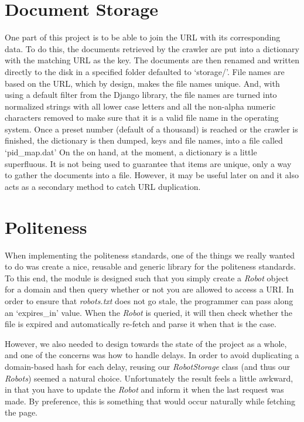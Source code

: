 \documentclass[letterpaper,11pt,twoside]{article}
\begin{document}
\section{Document Storage}
One part of this project is to be able to join the URL with its corresponding data. To do this, the documents retrieved by the crawler are put into a dictionary with the matching URL as the key. The documents are then renamed and written directly to the disk in a specified folder defaulted to ‘storage/’. File names are based on the URL, which by design, makes the file names unique. And, with using a default filter from the Django library, the file names are turned into normalized strings with all lower case letters and all the non-alpha numeric characters removed to make sure that it is a valid file name in the operating system. Once a preset number (default of a thousand) is reached or the crawler is finished, the dictionary is then dumped, keys and file names, into a file called ‘pid\_map.dat’
On the on hand, at the moment, a dictionary is a little superfluous. It is not being used to guarantee that items are unique, only a way to gather the documents into a file. However, it may be useful later on and it also acts as a secondary method to catch URL duplication.

\section{Politeness}
When implementing the politeness standards, one of the things we really wanted to do was create a nice, reusable and generic library for the politeness standards. To this end, the module is designed such that you simply create a \emph{Robot} object for a domain and then query whether or not you are allowed to access a URI. In order to ensure that \emph{robots.txt} does not go stale, the programmer can pass along an `expires\_in' value. When the \emph{Robot} is queried, it will then check whether the file is expired and automatically re-fetch and parse it when that is the case.

However, we also needed to design towards the state of the project as a whole, and one of the concerns was how to handle delays. In order to avoid duplicating a domain-based hash for each delay, reusing our \emph{RobotStorage} class (and thus our \emph{Robots}) seemed a natural choice. Unfortunately the result feels a little awkward, in that you have to update the \emph{Robot} and inform it when the last request was made. By preference, this is something that would occur naturally while fetching the page.
\end{document}
